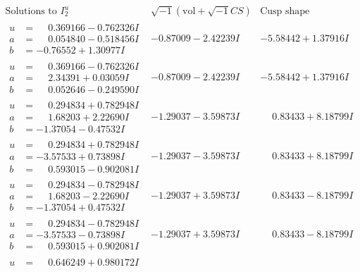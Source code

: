 \documentclass[1p]{elsarticle_modified}
\theoremstyle{definition}
\newcommand{\I}{\sqrt{-1}}
\begin{document}
$$\begin{array}{c|c|c}
\text{Solutions to }I^u_{2}& \I (\text{vol} + \sqrt{-1}CS) & \text{Cusp shape}\\
 \hline 
\begin{aligned}
u &= \phantom{-}0.369166 - 0.762326 I \\
a &= \phantom{-}0.054840 - 0.518456 I \\
b &= -0.76552 + 1.30977 I\end{aligned}
 & -0.87009 - 2.42239 I & -5.58442 + 1.37916 I \\ \hline\begin{aligned}
u &= \phantom{-}0.369166 - 0.762326 I \\
a &= \phantom{-}2.34391 + 0.03059 I \\
b &= \phantom{-}0.052646 - 0.249590 I\end{aligned}
 & -0.87009 - 2.42239 I & -5.58442 + 1.37916 I \\ \hline\begin{aligned}
u &= \phantom{-}0.294834 + 0.782948 I \\
a &= \phantom{-}1.68203 + 2.22690 I \\
b &= -1.37054 - 0.47532 I\end{aligned}
 & -1.29037 - 3.59873 I & \phantom{-}0.83433 + 8.18799 I \\ \hline\begin{aligned}
u &= \phantom{-}0.294834 + 0.782948 I \\
a &= -3.57533 + 0.73898 I \\
b &= \phantom{-}0.593015 - 0.902081 I\end{aligned}
 & -1.29037 - 3.59873 I & \phantom{-}0.83433 + 8.18799 I \\ \hline\begin{aligned}
u &= \phantom{-}0.294834 - 0.782948 I \\
a &= \phantom{-}1.68203 - 2.22690 I \\
b &= -1.37054 + 0.47532 I\end{aligned}
 & -1.29037 + 3.59873 I & \phantom{-}0.83433 - 8.18799 I \\ \hline\begin{aligned}
u &= \phantom{-}0.294834 - 0.782948 I \\
a &= -3.57533 - 0.73898 I \\
b &= \phantom{-}0.593015 + 0.902081 I\end{aligned}
 & -1.29037 + 3.59873 I & \phantom{-}0.83433 - 8.18799 I \\ \hline\begin{aligned}
u &= \phantom{-}0.646249 + 0.980172 I \\

\end{aligned}
\end{array}$$
\end{document}
